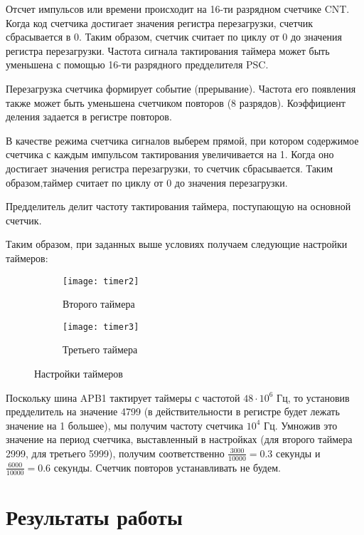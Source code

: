 Отсчет импульсов или времени происходит на 16-ти разрядном счетчике CNT. Когда код счетчика достигает значения регистра 
перезагрузки, счетчик сбрасывается в 0. Таким образом, счетчик считает по циклу от 0 до значения регистра перезагрузки.
Частота сигнала тактирования таймера может быть уменьшена с помощью 16-ти разрядного предделителя PSC.

Перезагрузка счетчика формирует событие (прерывание). Частота его появления также может быть уменьшена счетчиком повторов (8 разрядов). 
Коэффициент деления задается в регистре повторов.

В качестве режима счетчика сигналов выберем прямой, при котором  содержимое счетчика с каждым импульсом тактирования увеличивается на 1. 
Когда оно достигает значения регистра перезагрузки, то счетчик сбрасывается. Таким образом,таймер считает по циклу от 0 до значения перезагрузки. 

Предделитель делит частоту тактирования таймера, поступающую на основной счетчик.

Таким образом, при заданных выше условиях получаем следующие настройки таймеров:
\begin{figure}[H]
    \begin{subfigure}{.6\linewidth}
        \texttt{[image: timer2]}
        \caption{Второго таймера}
    \end{subfigure}
    \begin{subfigure}{.6\linewidth}
        \texttt{[image: timer3]}
        \caption{Третьего таймера}
    \end{subfigure}
    \caption{Настройки таймеров}
\end{figure}

Поскольку шина APB1 тактирует таймеры с частотой $48 \cdot 10^{6}$ Гц, то установив предделитель на значение 4799 (в 
действительности в регистре будет лежать значение на 1 большее), мы получим частоту счетчика $10^4$ Гц. Умножив это 
значение на период счетчика, выставленный в настройках (для второго таймера 2999, для третьего 5999), получим соответственно
$\frac{3000}{10000} = 0.3$ секунды и $\frac{6000}{10000} = 0.6$ секунды. Счетчик повторов устанавливать не будем.
\newpage

\section{Результаты работы}
